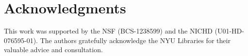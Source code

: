 \documentclass{sig-alternate}
\begin{document}
\section*{Acknowledgments}

This work was supported by the NSF (BCS-1238599) and the NICHD (U01-HD-076595-01).
The authors gratefully acknowledge the NYU Libraries for their valuable advice and consultation.



\end{document}

